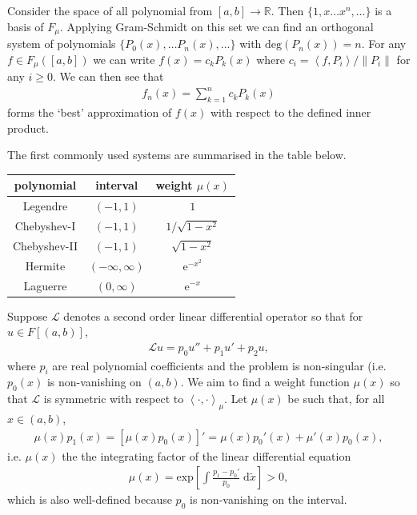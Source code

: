\documentclass[letter-paper]{tufte-book}
\newcommand{\ex}{\mathrm{e}}
\newcommand{\inner}[2]{\left\langle #1, #2\right\rangle}
\begin{document}
Consider the space of all polynomial from $[a,b] \to \mathbb{R}$. Then $\{1, x\ldots x^n, \ldots\}$ is a basis of $F_\mu$. Applying Gram-Schmidt on this set we can find an orthogonal system of polynomials $\{P_0(x), \ldots P_n(x), \ldots\}$ with $\mbox{deg}(P_n(x)) = n$. For any $f \in F_\mu([a,b])$ we can write $f(x) = c_k P_k(x)$ where $c_i = \inner{f}{P_i}/\|P_i\|$ for any $i\geq 0$. We can then see that
\begin{align*}
  f_n(x) = \sum_{k=1}^n c_k P_k(x)
\end{align*}
forms the `best' approximation of $f(x)$ with respect to the defined inner product.

The first commonly used systems are summarised in the table below.

\begin{center}
\begin{tabular}{c|c|c}
  polynomial & interval & weight $\mu(x)$\\
  \hline
  Legendre & $(-1, 1)$ & $1$\\
  Chebyshev-I & $(-1, 1)$ & $1/\sqrt{1-x^2}$\\
  Chebyshev-II & $(-1, 1)$ & $\sqrt{1-x^2}$\\
  Hermite & $(-\infty, \infty)$ & $\ex^{-x^2}$\\
  Laguerre & $(0, \infty)$ & $\ex^{-x}$\\
\end{tabular}
\end{center}

Suppose $\mathcal{L}$ denotes a second order linear differential operator so that for $u \in F[(a,b)]$,
\begin{align*}
  \mathcal{L}u = p_0 u'' + p_1 u' + p_2 u,
\end{align*}
where $p_i$ are real polynomial coefficients and the problem is non-singular (i.e. $p_0(x)$ is non-vanishing on $(a,b)$. We aim to find a weight function $\mu(x)$ so that $\mathcal{L}$ is symmetric with respect to $\inner{\cdot}{\cdot}_\mu$. Let $\mu(x)$ be such that, for all $x\in(a,b)$,
\begin{align*}
  \mu(x) p_1(x) = [\mu(x) p_0(x)]' = \mu(x) p_0'(x) + \mu'(x) p_0(x),
\end{align*}
i.e. $\mu(x)$ the the integrating factor of the linear differential equation
\begin{align*}
  \mu(x) = \mbox{exp}\left[\int \frac{p_1 - p_0'}{p_0}\; \mathrm{d}\tilde{x}\right] > 0,
\end{align*}
which is also well-defined because $p_0$ is non-vanishing on the interval.
\end{document}
